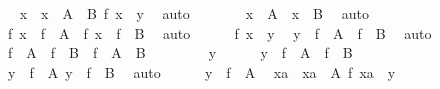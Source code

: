 \begin{isabellebody}
\begin{exercise}[subtitle=Svojstva funkcija]
\ \isamarkupfalse%
\ x\ \ {\isachardoublequoteopen}x\ {\isasymin}\ A\ {\isasyminter}\ B{\isachardoublequoteclose}\ {\isachardoublequoteopen}f\ x\ {\isacharequal}{\kern0pt}\ y{\isachardoublequoteclose}\ \isamarkupfalse%
\ auto\isanewline
\ \ \ \ \isamarkupfalse%
\ \isamarkupfalse%
\ {\isachardoublequoteopen}x\ {\isasymin}\ A\ {\isasymand}\ x\ {\isasymin}\ B{\isachardoublequoteclose}\ \isamarkupfalse%
\ auto\isanewline
\ \ \ \ \isamarkupfalse%
\ \isamarkupfalse%
\ {\isachardoublequoteopen}f\ x\ {\isasymin}\ f\ {\isacharbackquote}{\kern0pt}\ A\ {\isasymand}\ f\ x\ {\isasymin}\ f\ {\isacharbackquote}{\kern0pt}\ B{\isachardoublequoteclose}\ \isamarkupfalse%
\ auto\isanewline
\ \ \ \ \isamarkupfalse%
\ {\isacartoucheopen}f\ x\ {\isacharequal}{\kern0pt}\ y{\isacartoucheclose}\ \isamarkupfalse%
\ {\isachardoublequoteopen}y\ {\isasymin}\ f\ {\isacharbackquote}{\kern0pt}\ A\ {\isasyminter}\ f\ {\isacharbackquote}{\kern0pt}\ B{\isachardoublequoteclose}\ \isamarkupfalse%
\ auto\isanewline
\ \ \isamarkupfalse%
\isanewline
{}\isamarkupfalse%
\isanewline
\ \ \isamarkupfalse%
\ {\isachardoublequoteopen}f\ {\isacharbackquote}{\kern0pt}\ A\ {\isasyminter}\ f\ {\isacharbackquote}{\kern0pt}\ B\ {\isasymsubseteq}\ f\ {\isacharbackquote}{\kern0pt}\ {\isacharparenleft}{\kern0pt}A\ {\isasyminter}\ B{\isacharparenright}{\kern0pt}{\isachardoublequoteclose}\isanewline
\ \ \isamarkupfalse%
\isanewline
\ \ \ \ \isamarkupfalse%
\ y\isanewline
\ \ \ \ \isamarkupfalse%
\ {\isachardoublequoteopen}y\ {\isasymin}\ f\ {\isacharbackquote}{\kern0pt}\ A\ {\isasyminter}\ f\ {\isacharbackquote}{\kern0pt}\ B{\isachardoublequoteclose}\isanewline
\ \ \ \ \isamarkupfalse%
\ \isamarkupfalse%
\ {\isachardoublequoteopen}y\ {\isasymin}\ f\ {\isacharbackquote}{\kern0pt}\ A{\isachardoublequoteclose}\ {\isachardoublequoteopen}y\ {\isasymin}\ f\ {\isacharbackquote}{\kern0pt}\ B{\isachardoublequoteclose}\ \isamarkupfalse%
\ auto\isanewline
\ \ \ \ \isamarkupfalse%
\ {\isacartoucheopen}y\ {\isasymin}\ f\ {\isacharbackquote}{\kern0pt}\ A{\isacartoucheclose}\ \isamarkupfalse%
\ xa\ \ {\isachardoublequoteopen}xa\ {\isasymin}\ A{\isachardoublequoteclose}\ {\isachardoublequoteopen}f\ xa\ {\isacharequal}{\kern0pt}\ y{\isachardoublequoteclose}\ \isamarkupfalse%

\end{exercise}
\end{isabellebody}
